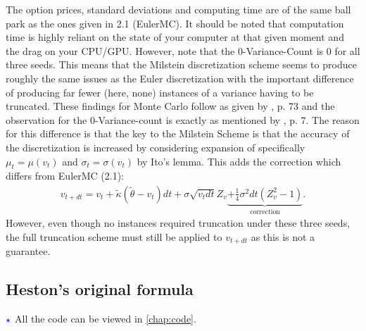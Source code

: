 \documentclass[12pt]{article}
\numberwithin{equation}{section}
\begin{document}
The option prices, standard deviations and computing time are of the same ball park as the ones
given in 2.1 (EulerMC). It should be noted that computation time is highly
reliant on the state of your computer at that given moment and the drag on your CPU/GPU. However, note that the 0-Variance-Count is $0$ for
all three seeds. This means that the Milstein discretization scheme seems to
produce roughly the same issues as the Euler discretization with the important
difference of producing far fewer (here, none) instances of a variance having to
be truncated. These findings for Monte Carlo
follow as given by
\cite{Havrylenko2024}, p. 73 and the observation for the 0-Variance-count is
exactly as mentioned by \cite{Rouah2024}, p. 7. The reason for this difference
is that the key to the Milstein Scheme is that the accuracy of the
discretization is increased by considering expansion of specifically $\mu_t=\mu(v_t)$ and
$\sigma_t=\sigma(v_t)$ by Ito's lemma. This adds the correction which differs
from EulerMC (2.1):
\begin{align*}
    v_{t+dt} = v_t +\tilde{\kappa}(\tilde{\theta} - v_t)dt + \sigma \sqrt{v_tdt}Z_v\underbrace{+\frac{1}{4}\sigma^2dt\left (Z_v^2-1 \right )}_{\text{correction}}.
\end{align*}
However, even though no instances required truncation under these three seeds, the full
truncation scheme must still be applied to $v_{t+dt}$ as this is not a guarantee.
\subsection{Heston’s original formula}
$\textcolor{blue}{\star}$ All the code can be viewed in \autoref{chap:code}.
\end{document}
